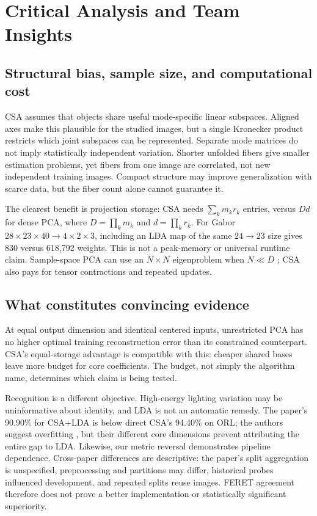 \section{Critical Analysis and Team Insights}
\label{sec:analysis}
\subsection{Structural bias, sample size, and computational cost}
CSA assumes that objects share useful mode-specific linear subspaces. Aligned
axes make this plausible for the studied images, but a single Kronecker product
restricts which joint subspaces can be represented. Separate mode matrices do
not imply statistically independent variation. Shorter unfolded fibers give
smaller estimation problems, yet fibers from one image are correlated, not new
independent training images. Compact structure may improve generalization with
scarce data, but the fiber count alone cannot guarantee it.

The clearest benefit is projection storage: CSA needs $\sum_km_kr_k$ entries,
versus $Dd$ for dense PCA, where $D=\prod_km_k$ and $d=\prod_kr_k$.
For Gabor $28\times23\times40\to4\times2\times3$, including an LDA map of the same
$24\to23$ size gives 830 versus 618,792 weights. This is not a peak-memory or universal
runtime claim. Sample-space PCA can use an $N\times N$ eigenproblem
when $N\ll D$ \citep[p.~40, footnote~2]{xu2008csa}; CSA also pays for tensor contractions and
repeated updates.

\subsection{What constitutes convincing evidence}
At equal output dimension and identical centered inputs, unrestricted PCA has
no higher optimal training reconstruction error than its constrained counterpart.
CSA's equal-storage advantage is compatible with this: cheaper shared bases
leave more budget for core coefficients. The budget, not simply the algorithm
name, determines which claim is being tested.

Recognition is a different objective. High-energy lighting variation may be
uninformative about identity, and LDA is not an automatic remedy. The paper's
90.90\% for CSA+LDA is below direct CSA's 94.40\% on ORL; the authors suggest
overfitting \citep[Sec.~IV-C]{xu2008csa}, but their different core dimensions prevent attributing the entire
gap to LDA. Likewise, our metric reversal demonstrates pipeline dependence.
Cross-paper differences are descriptive: the paper's split aggregation is
unspecified, preprocessing and partitions may differ, historical probes
influenced development, and repeated splits reuse images. FERET agreement therefore does not prove a
better implementation or statistically significant superiority.

